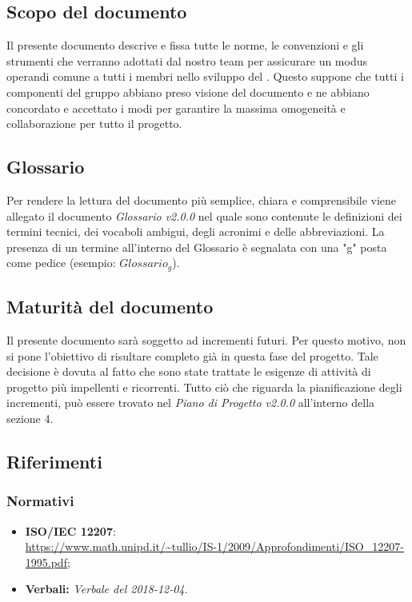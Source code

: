 \subsection{Scopo del documento}
Il presente documento descrive e fissa tutte le norme, le convenzioni e gli strumenti che verranno adottati dal nostro team per assicurare un modus operandi comune a tutti i membri nello sviluppo del . Questo suppone che tutti i componenti del gruppo abbiano preso visione del documento e ne abbiano concordato e accettato i modi per garantire la massima omogeneità e collaborazione per tutto il progetto.
\subsection{Glossario}
Per rendere la lettura del documento più semplice, chiara e comprensibile viene allegato il documento \emph{Glossario v2.0.0} nel quale sono contenute le definizioni dei termini tecnici, dei vocaboli ambigui, degli acronimi e delle abbreviazioni. La presenza di un termine all'interno del Glossario è segnalata con una "g" posta come pedice (esempio: $Glossario_{g}$).
\subsection{Maturità del documento}
Il presente documento sarà soggetto ad incrementi futuri. Per questo motivo, non si pone l'obiettivo di risultare completo già in questa fase del progetto.
Tale decisione è dovuta al fatto che sono state trattate le esigenze di attività di progetto più impellenti e ricorrenti.
Tutto ciò che riguarda la pianificazione degli incrementi, può essere trovato nel \emph{Piano di Progetto v2.0.0} all'interno della sezione 4.
\subsection{Riferimenti}
\subsubsection{Normativi}
\begin{itemize}
	\item \textbf{ISO/IEC 12207}:\\ \url{https://www.math.unipd.it/~tullio/IS-1/2009/Approfondimenti/ISO_12207-1995.pdf};
	\item \textbf{Verbali:} \emph{Verbale del 2018-12-04}.
\end{itemize}
